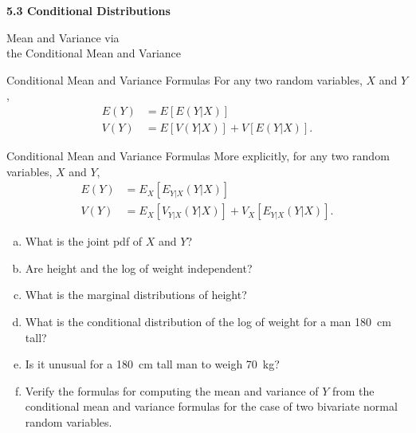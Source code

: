 \begin{frame}
  \frametitle{}
  
  \begin{center}
    \Large{\textbf{5.3 Conditional Distributions}}

    \bigskip

    \Large{Mean and Variance via\\ the Conditional Mean and Variance}
  \end{center}
  
\end{frame}

\begin{frame}

  \begin{block}{Conditional Mean and Variance Formulas}
  For any two random variables, $X$ and $Y$,
  \begin{align*}
      E(Y)&=E[E(Y|X)]\\
      V(Y)&=E[V(Y|X)] + V[E(Y|X)].
  \end{align*}
    \end{block}
\end{frame}

\begin{frame}

  \begin{block}{Conditional Mean and Variance Formulas}
  More explicitly, for any two random variables, $X$ and $Y$,
  \begin{align*}
      E(Y)&=E_{X}[E_{Y|X}(Y|X)]\\
      V(Y)&=E_{X}[V_{Y|X}(Y|X)] + V_X[E_{Y|X}(Y|X)].
  \end{align*}
    \end{block}
\end{frame}

\begin{frame}
  \begin{block}{\examplectd}
    \begin{enumerate}[a)]
      
    \item What is the joint pdf of $X$ and $Y$? 

    \item Are height and the log of weight independent?
      
    \item What is the marginal distributions of height?
      
    \item What is the conditional distribution of the log of weight for a man 180~cm tall? 
    
    \item Is it unusual for a 180~cm tall man to weigh 70~kg?

    \item Verify the formulas for computing the mean and variance of $Y$ from the conditional mean and variance formulas for the case of two bivariate normal random variables. 
      
    \end{enumerate}
  \end{block}
\end{frame}

